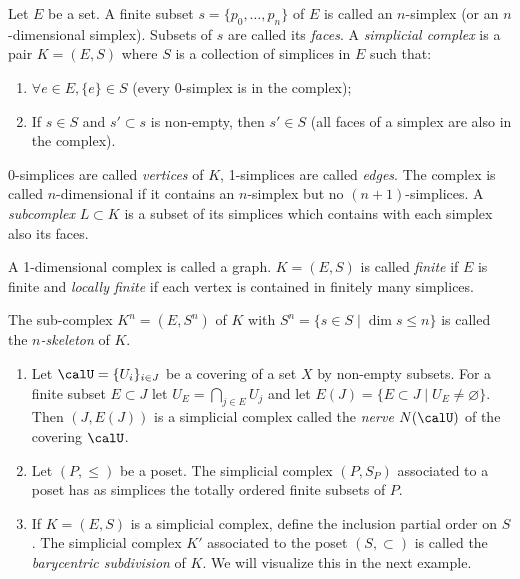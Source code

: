 \begin{defn}
    Let $E$ be a set. A finite subset $s=\{ p_0,\ldots,p_n\}$ of $E$ is called an $n$-simplex (or an $n$-dimensional simplex). Subsets of $s$ are called its \emph{faces}. A \emph{simplicial complex} is a pair $K=(E,S)$ where $S$ is a collection of simplices in $E$ such that:
    \begin{enumerate}
        \item $\forall e\in E, \{e\}\in S$ (every 0-simplex is in the complex);
        \item If $s\in S$ and $s'\subset s$ is non-empty, then $s'\in S$ (all faces of a simplex are also in the complex).
    \end{enumerate}
    0-simplices are called \emph{vertices} of $K$, 1-simplices are called \emph{edges}. The complex is called $n$-dimensional if it contains an $n$-simplex but no $(n+1)$-simplices. A \emph{subcomplex} $L\subset K$ is a subset of its simplices which contains with each simplex also its faces.
    
    A 1-dimensional complex is called a graph. $K=(E,S)$ is called \emph{finite} if $E$ is finite and \emph{locally finite} if each vertex is contained in finitely many simplices.
    
    The sub-complex $K^n=(E,S^n)$ of $K$ with $S^n=\{s\in S\mid \dim s\leq n\}$ is called the \emph{$n$-skeleton} of $K$.
\end{defn}

\begin{example}
    \begin{enumerate}
        \item Let $\calU=\{U_i\}_{i\in J}$ be a covering of a set $X$ by non-empty subsets. For a finite subset $E\subset J$ let $U_E=\bigcap_{j\in E}U_j$ and let $E(J)=\{E\subset J\mid U_E\neq\varnothing\}$. Then $(J,E(J))$ is a simplicial complex called the \emph{nerve} $N(\calU)$ of the covering $\calU$.
        \item Let $(P,\leq)$ be a poset. The simplicial complex $(P,S_P)$ associated to a poset has as simplices the totally ordered finite subsets of $P$.
        \item If $K=(E,S)$ is a simplicial complex, define the inclusion partial order on $S$. The simplicial complex $K'$ associated to the poset $(S,\subset)$ is called the \emph{barycentric subdivision} of $K$. We will visualize this in the next example.
    \end{enumerate}
\end{example}

